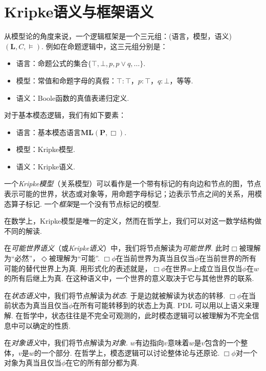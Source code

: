 \section{Kripke语义与框架语义}

从模型论的角度来说，一个逻辑框架是一个三元组：(语言，模型，语义) $(\mathbf L,C,\vDash)$. 例如在命题逻辑中，这三元组分别是：
\begin{itemize}
    \item 语言：命题公式的集合$\{\top,\bot,p,p\vee q,\dots\}$.
    \item 模型：常值和命题字母的真假：$\top:\top$，$p:\top$，$q:\bot$，等等.
    \item 语义：Boole函数的真值表递归定义.
\end{itemize}

对于基本模态逻辑，我们有如下要素：
\begin{itemize}
    \item 语言：基本模态语言$\mathbf{ML}(\mathbf P, \Box)$.
    \item 模型：Kripke模型.
    \item 语义：Kripke语义.
\end{itemize}

一个\emph{Kripke模型}（关系模型）可以看作是一个带有标记的有向边和节点的图，节点表示可能的世界，状态或对象等，用命题字母标记；边表示节点之间的关系，用模态算子标记. 一个\emph{框架}是一个没有节点标记的模型.

在数学上，Kripke模型是唯一的定义，然而在哲学上，我们可以对这一数学结构做不同的解读. 

在\emph{可能世界语义}（或\emph{Kripke语义}）中，我们将节点解读为\emph{可能世界}. 此时$\Box$被理解为“必然”，$\Diamond$被理解为“可能”. $\Box\phi$在当前世界为真当且仅当$\phi$在当前世界的所有可能的替代世界上为真. 用形式化的表述就是，$\Box\phi$在世界$w$上成立当且仅当$\phi$在$w$的所有后继上为真. 在这种语义中，一个世界的意义取决于它与其他世界的联系.

在\emph{状态语义}中，我们将节点解读为\emph{状态}. 于是边就被解读为状态的转移. $\Box\phi$在当前状态为真当且仅当$\phi$在所有可能转移到的状态上为真. PDL 可以用以上语义来理解. 在哲学中，状态往往是不完全可观测的，此时模态逻辑可以被理解为不完全信息中可以确定的性质.

在\emph{对象语义}中，我们将节点解读为\emph{对象}. $w$有边指向$v$意味着$w$是$v$包含的一个整体，$v$是$w$的一个部分. 在哲学上，模态逻辑可以讨论整体论与还原论. $\Box\phi$对一个对象为真当且仅当$\phi$在它的所有部分都为真.

